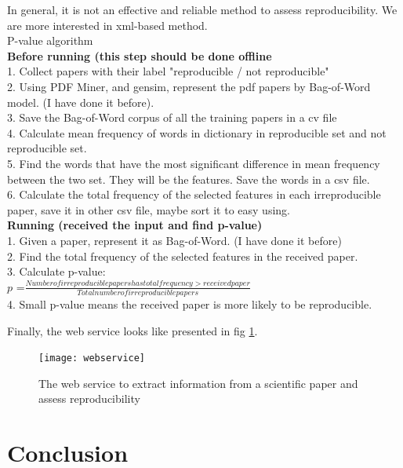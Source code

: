 \documentclass[
10pt, %
a4paper, %
oneside, %
headinclude,footinclude, %
BCOR5mm, %
]{scrartcl}
\begin{document}
In general, it is not an effective and reliable method to assess reproducibility. We are more interested in xml-based method.\\

P-value algorithm\\
\textbf{Before running (this step should be done offline} \\
1. Collect papers with their label "reproducible / not reproducible"\\
2. Using PDF Miner, and gensim, represent the pdf papers by Bag-of-Word model. (I have done it before).\\
3. Save the Bag-of-Word corpus of all the training papers in a cv file\\
4. Calculate mean frequency of words in dictionary in reproducible set and not reproducible set.\\
5. Find the words that have the most significant difference in mean frequency between the two set. They will be the features. Save the words in a csv file.\\
6. Calculate the total frequency of the selected features in each irreproducible paper, save it in other csv file, maybe sort it to easy using.\\
\textbf{Running (received the input and find p-value)}\\
1. Given a paper, represent it as Bag-of-Word. (I have done it before)\\
2. Find the total frequency of the selected features in the received paper.\\
3. Calculate p-value:\\
$p$ =$ \frac{Number of irreproducible papers has total frequency > received paper}{Total number of irreproducible papers}$\\
4. Small p-value means the received paper is more likely to be reproducible.

Finally, the web service looks like presented in fig \ref{fig:web_service}.

\begin{figure}[h]
    \centering
    \texttt{[image: webservice]}
    \caption{The web service to extract information from a scientific paper and assess reproducibility}
    \label{fig:web_service}
\end{figure}
\newpage


\section {Conclusion}
\end{document}
